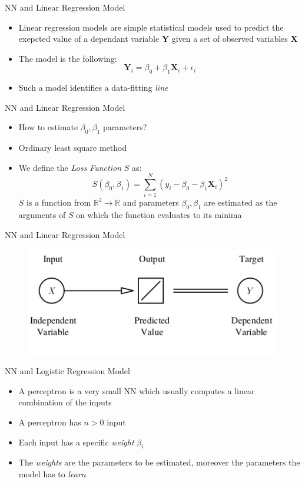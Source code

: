 \documentclass[xcolor ={table,usenames,dvipsnames}]{beamer}
\theoremstyle{definition}
\begin{document}
\begin{frame}{NN and Linear Regression Model}
\begin{itemize}
	\item Linear regression models are simple statistical models used to predict the exepcted value of a dependant variable \textbf{Y} given a set of observed variables \textbf{X}
	\item The model is the following:
	$$
	\textbf{Y}_i = \beta_0 + \beta_1 \textbf{X}_i + \epsilon_i
	$$
	\item Such a model identifies a data-fitting \emph{line} 
\end{itemize}
\end{frame}
\begin{frame}{NN and Linear Regression Model}
\begin{itemize}
	\item How to estimate $\beta_0,\beta_1$ parameters?
	\item \color{red} Ordinary least square \color{black} method
	\item We define the \emph{Loss Function} $S$ as:
	$$
	S(\beta_0,\beta_1) = \sum_{i=1}^N (y_i - \beta_0 - \beta_1 \textbf{X}_i)^2
	$$
	$S$ is a function from $\mathbb{R}^2 \rightarrow \mathbb{R}$ and parameters $\beta_0,\beta_1$ are estimated  as the arguments of $S$ on which the function evaluates to its minima
\end{itemize}
\end{frame}
\begin{frame}{NN and Linear Regression Model}
	\begin{figure}[h!]
	\centering
	\includegraphics[scale=2.5]{../Relazione/img/linreg}
\end{figure}
\end{frame}
\begin{frame}{NN and Logistic Regression Model}
\begin{itemize}
	\item A perceptron is a very small NN which usually computes a linear combination of the inputs
	\item A perceptron has $n>0$ input
	\item Each input has a specific \emph{weight} $\beta_i$
	\item The \emph{weights} are the parameters to be estimated, moreover the parameters the model has to \emph{learn}
\end{itemize}
\end{frame}
\end{document}

